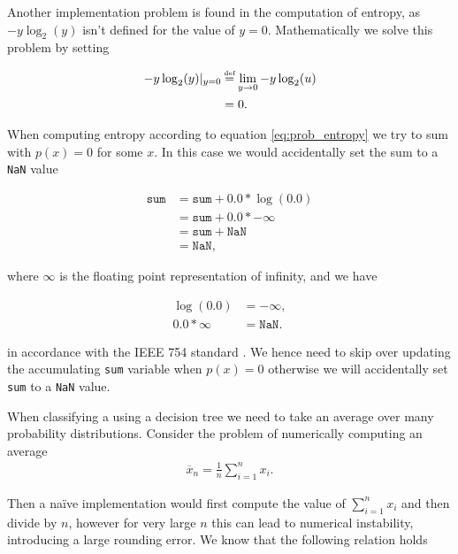 \documentclass[12pt,twoside,notitlepage]{report}
\newcommand\defeq{\stackrel{\mathclap{\normalfont\tiny\mbox{def}}}{=}}
\begin{document}
                Another implementation problem is found in the computation of entropy, as $-y\log_2(y)$ isn't defined for 
                the value of $y=0$. Mathematically we solve this problem by setting

                \begin{align}
                    -y\log_2(y)|_{y=0} & \defeq \lim_{y\to 0} -y \log_2(u) \\
                        & = 0.
                \end{align}

                When computing entropy according to equation \ref{eq:prob_entropy} we try to sum with $p(x)=0$ for 
                some $x$. In this case we would accidentally set the sum to a \texttt{NaN} value

                \begin{align}
                  \texttt{sum} &= \texttt{sum} + 0.0 * \log(0.0) \\
                    &= \texttt{sum} + 0.0 * -\infty \\
                    &= \texttt{sum} + \texttt{NaN}\\
                    &= \texttt{NaN},
                \end{align}

                where $\infty$ is the floating point representation of infinity, and we have 

                \begin{align}
                  \log(0.0) &= -\infty, \\
                  0.0 * \infty &= \texttt{NaN}.  
                \end{align}

                in accordance with the IEEE 754 standard \cite{1985--ieee754}. We hence need to skip over updating the 
                accumulating \texttt{sum} variable when $p(x) = 0$ otherwise we will accidentally set \texttt{sum} to a 
                \texttt{NaN} value.

                When classifying a using a decision tree we need to take an average over many probability distributions. 
                Consider the problem of numerically computing an average
                \begin{align}
                    \overline{x}_n = \frac{1}{n} \sum\limits_{i=1}^n x_i.
                    \label{eq:sum}
                \end{align}

                Then a na\"{i}ve implementation would first compute the value of $\sum\limits_{i=1}^n x_i$ and then 
                divide by $n$, however for very large $n$ this can lead to numerical instability, introducing a large 
                rounding error. We know that the following relation holds 
\end{document}
